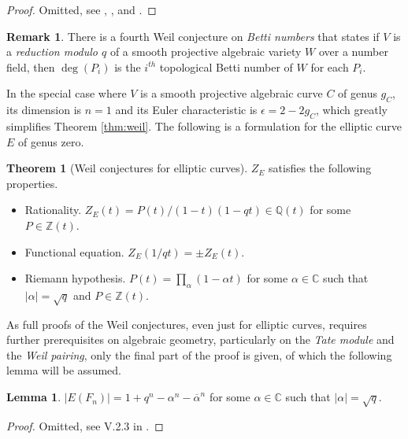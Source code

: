 \documentclass{article}
\newcommand{\Z}{\mathbb{Z}}
\newcommand{\Q}{\mathbb{Q}}
\newcommand{\C}{\mathbb{C}}
\newcommand{\rb}[1]{\left( #1 \right)}
\newcommand{\abs}[1]{\left\lvert #1 \right\rvert}
\theoremstyle{definition}\newtheorem*{definition}{Definition}
\theoremstyle{definition}\newtheorem*{example}{Example}
\theoremstyle{definition}\newtheorem*{remark}{Remark}
\newtheorem{lemma}[proposition]{Lemma}
\newtheorem{theorem}[proposition]{Theorem}
\begin{document}
\begin{proof}
Omitted, see \cite{weil1}, \cite{weil2}, and \cite{weil3}.
\end{proof}

\pagebreak

\begin{remark}
There is a fourth Weil conjecture on \emph{Betti numbers} that states if $ V $ is a \emph{reduction modulo $ q $} of a smooth projective algebraic variety $ W $ over a number field, then $ \deg\rb{P_i} $ is the $ i^{th} $ topological Betti number of $ W $ for each $ P_i $.
\end{remark}

In the special case where $ V $ is a smooth projective algebraic curve $ C $ of genus $ g_C $, its dimension is $ n = 1 $ and its Euler characteristic is $ \epsilon = 2 - 2g_C $, which greatly simplifies Theorem \ref{thm:weil}. The following is a formulation for the elliptic curve $ E $ of genus zero.

\begin{theorem}[Weil conjectures for elliptic curves]
\label{thm:weilcurve}
$ Z_E $ satisfies the following properties.
\begin{itemize}
\item Rationality. $ Z_E\rb{t} = P\rb{t} / \rb{1 - t}\rb{1 - qt} \in \Q\rb{t} $ for some $ P \in \Z\rb{t} $.
\item Functional equation. $ Z_E\rb{1 / qt} = \pm Z_E\rb{t} $.
\item Riemann hypothesis. $ P\rb{t} = \prod_\alpha \rb{1 - \alpha t} $ for some $ \alpha \in \C $ such that $ \abs{\alpha} = \sqrt{q} $ and $ P \in \Z\rb{t} $.
\end{itemize}
\end{theorem}

As full proofs of the Weil conjectures, even just for elliptic curves, requires further prerequisites on algebraic geometry, particularly on the \emph{Tate module} and the \emph{Weil pairing}, only the final part of the proof is given, of which the following lemma will be assumed.

\begin{lemma}
$ \abs{E\rb{F_n}} = 1 + q^n - \alpha^n - \overline{\alpha}^n $ for some $ \alpha \in \C $ such that $ \abs{\alpha} = \sqrt{q} $.
\end{lemma}

\begin{proof}
Omitted, see V.2.3 in \cite{gtm}.
\end{proof}
\end{document}
